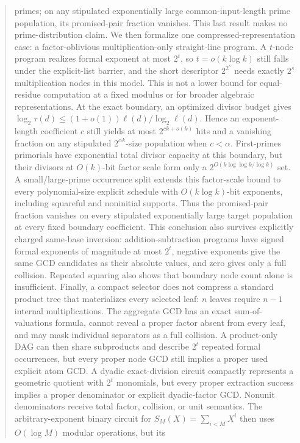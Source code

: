 \documentclass[11pt]{article}
\begin{document}
\begin{abstract}
primes; on any stipulated exponentially large common-input-length prime
population, its promised-pair fraction vanishes. This last result makes no
prime-distribution claim. We then formalize one compressed-representation
case: a factor-oblivious multiplication-only straight-line program. A
\(t\)-node program realizes formal exponent at most \(2^t\), so
\(t=o(k\log k)\) still falls under the explicit-list barrier, and the short
descriptor \(2^{2^s}\) needs exactly \(2^s\) multiplication nodes in this
model. This is not a lower bound for equal-residue computation at a fixed
modulus or for broader algebraic representations. At the exact boundary, an
optimized divisor budget gives
\(\log_2\tau(d)\le(1+o(1))\ell(d)/\log_2\ell(d)\). Hence an exponent-length
coefficient \(c\) still yields at most \(2^{ck+o(k)}\) hits and a vanishing
fraction on any stipulated \(2^{\alpha k}\)-size population when \(c<\alpha\).
First-primes primorials have exponential total divisor capacity at this
boundary, but their divisors at \(O(k)\)-bit factor scale form only a
\(2^{O(k\log\log k/\log k)}\) set. A small/large-prime occurrence split
extends this factor-scale bound to every polynomial-size explicit schedule
with \(O(k\log k)\)-bit exponents, including squareful and noninitial
supports. Thus the promised-pair fraction vanishes on every stipulated
exponentially large target population at every fixed boundary coefficient.
This conclusion also survives explicitly charged same-base inversion:
addition-subtraction programs have signed formal exponents of magnitude at
most \(2^t\), negative exponents give the same GCD candidates as their
absolute values, and zero gives only a full collision. Repeated squaring also
shows that boundary node count alone is insufficient. Finally, a compact
selector does not compress a standard product tree that materializes every
selected leaf: \(n\) leaves require \(n-1\) internal multiplications. The
aggregate GCD has an exact sum-of-valuations formula, cannot reveal a proper
factor absent from every leaf, and may mask individual separators as a full
collision. A product-only DAG can then share subproducts and describe
\(2^t\) repeated formal occurrences, but every proper node GCD still implies
a proper used explicit atom GCD. A dyadic exact-division circuit compactly
represents a geometric quotient with \(2^t\) monomials, but every proper
extraction success implies a proper denominator or explicit dyadic-factor
GCD. Nonunit denominators receive total factor, collision, or unit semantics.
The arbitrary-exponent binary circuit for
\(S_M(X)=\sum_{i<M}X^i\) then uses \(O(\log M)\) modular operations, but its

\end{abstract}
\end{document}
